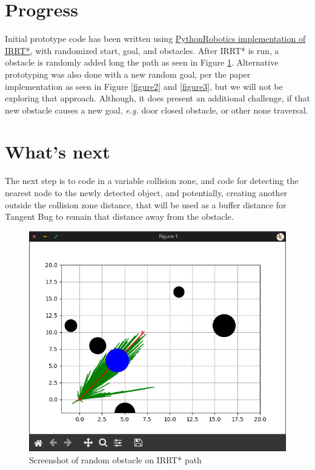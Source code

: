 \documentclass[12pt]{article}
\begin{document}
\section{Progress}
\indent \indent Initial prototype code has been written using \href{https://github.com/AtsushiSakai/PythonRobotics/tree/master/PathPlanning/InformedRRTStar}{PythonRobotics implementation of IRRT*}, with randomized
start, goal, and obstacles. After IRRT* is run, a obstacle is randomly added long the path
as seen in Figure \ref{figure1}. Alternative prototyping was also done with a new random goal, per the paper implementation as seen in Figure \ref{figure2} and \ref{figure3}, but we will not be exploring that approach. Although, it does present an additional challenge, if that new obstacle causes a new goal, \emph{e.g.}  door closed obstacle, or other none traversal.

\section{What's next}
\indent \indent The next step is to code in a variable collision zone, and code for detecting the nearest node to the newly detected object, and potentially, creating another outside the collision zone distance, that will be used as a buffer distance for Tangent Bug to remain that distance away from the
obstacle.

\vspace{1em}

\newpage
\addtolength{\topmargin}{2cm}


\begin{figure}[H]
\begin{center}
\includegraphics[scale=0.35]{screenshots/shot1_random_obstacle}
\caption{Screenshot of random obstacle on IRRT* path}
\label{figure1}
\end{center}
\end{figure}
\end{document}

